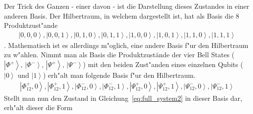 \begin{refsection}
Der Trick des Ganzen - einer davon - ist die Darstellung dieses Zustandes in einer anderen Basis. Der Hilbertraum, in welchem %
dargestellt ist, hat als Basis die 8 Produktzust"ande
\begin{align}
\left|  0,0,0 \right \rangle,\left|  0,0,1 \right \rangle,\left|  0,1,0 \right \rangle,\left|  0,1,1 \right \rangle,\left|  1,0,0 \right \rangle,\left|  1,0,1 \right \rangle,\left|  1,1,0 \right \rangle,\left|  1,1,1 \right \rangle
\end{align}.
Mathematisch ist es allerdings m"oglich, eine andere Basis f"ur den Hilbertraum zu w"ahlen. Nimmt man als Basis die Produktzustände der vier Bell States ($\left|\Phi^+\right\rangle$, $\left|\Phi^-\right\rangle$, $\left|\Psi^+\right\rangle$, $\left|\Psi^-\right\rangle$) mit den beiden Zust"anden eines einzelnen Qubits ($\left|0\right\rangle$ und $\left|1\right\rangle$) erh"alt man folgende Basis f"ur den Hilbertraum.
\begin{align}
\left|\Phi^{+}_{12},0\right\rangle,
\left|\Phi^{+}_{12},1\right\rangle, 
\left|\Phi^{-}_{12},0\right\rangle,
\left|\Phi^{-}_{12},1\right\rangle,
\left|\Psi^{+}_{12},0\right\rangle,
\left|\Psi^{+}_{12},1\right\rangle,
\left|\Psi^{-}_{12},0\right\rangle,
\left|\Psi^{-}_{12},1\right\rangle
\end{align}
Stellt man nun den Zustand in Gleichung~\ref{eq:full_system2} in dieser Basis dar, erh"alt dieser die Form


\end{refsection}
